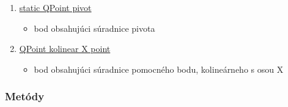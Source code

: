 \documentclass[12pt]{article}
\begin{document}
\begin{enumerate}
\item[] \underline{static QPoint pivot} 
\begin{itemize}
\item bod obsahujúci súradnice pivota
\end{itemize}
\item[] \underline{QPoint kolinear X point} 
\begin{itemize}
\item bod obsahujúci súradnice pomocného bodu, kolineárneho s osou X
\end{itemize}
\end{enumerate}

\subsubsection{Metódy}
\end{document}
